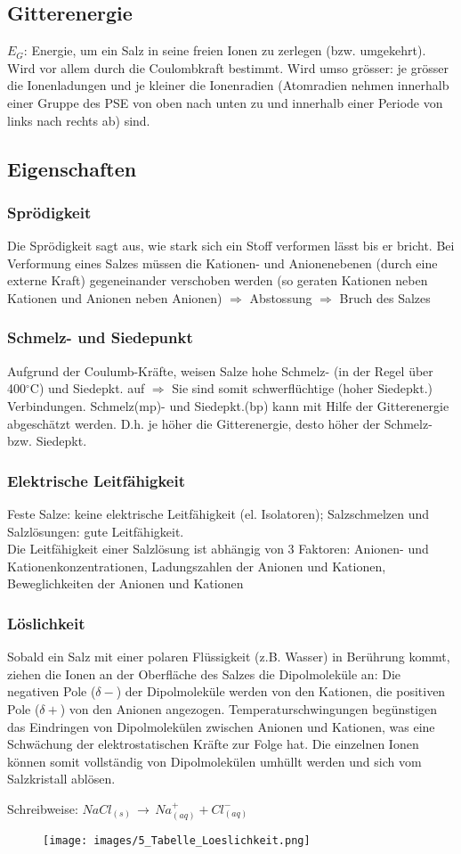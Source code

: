 \subsection{Gitterenergie}
$E_G$: Energie, um ein Salz in seine freien Ionen zu zerlegen (bzw. umgekehrt). Wird vor allem durch die Coulombkraft bestimmt. Wird umso grösser: je grösser die Ionenladungen und je kleiner die Ionenradien (Atomradien nehmen innerhalb einer Gruppe des PSE von oben nach unten zu und innerhalb einer Periode von links nach rechts ab) sind.

\subsection{Eigenschaften}
\subsubsection{Sprödigkeit}
Die Sprödigkeit sagt aus, wie stark sich ein Stoff verformen lässt bis er bricht. Bei Verformung eines Salzes müssen die Kationen- und Anionenebenen (durch eine externe Kraft) gegeneinander verschoben werden (so geraten Kationen neben Kationen und Anionen neben Anionen) $\Rightarrow$ Abstossung $\Rightarrow$ Bruch des Salzes

\subsubsection{Schmelz- und Siedepunkt}
Aufgrund der Coulumb-Kräfte, weisen Salze hohe Schmelz- (in der Regel über 400$^\circ$C) und Siedepkt. auf $\Rightarrow$ Sie sind somit schwerflüchtige (hoher Siedepkt.) Verbindungen. Schmelz(mp)- und Siedepkt.(bp) kann mit Hilfe der Gitterenergie abgeschätzt werden. D.h. je höher die Gitterenergie, desto höher der Schmelz- bzw. Siedepkt. 

\subsubsection{Elektrische Leitfähigkeit}
Feste Salze: keine elektrische Leitfähigkeit (el. Isolatoren); Salzschmelzen und Salzlösungen: gute Leitfähigkeit.\\
Die Leitfähigkeit einer Salzlösung ist abhängig von 3 Faktoren: Anionen- und Kationenkonzentrationen, Ladungszahlen der Anionen und Kationen, Beweglichkeiten der Anionen und Kationen

\subsubsection{Löslichkeit}
Sobald ein Salz mit einer polaren Flüssigkeit (z.B. Wasser) in Berührung kommt, ziehen die Ionen an der Oberfläche des Salzes die Dipolmoleküle an: Die negativen Pole ($\delta-$) der Dipolmoleküle werden von den Kationen, die positiven Pole ($\delta+$) von den Anionen angezogen. Temperaturschwingungen begünstigen das Eindringen von Dipolmolekülen zwischen Anionen und Kationen, was eine Schwächung der elektrostatischen Kräfte zur Folge hat. Die einzelnen Ionen können somit vollständig von Dipolmolekülen umhüllt werden und sich vom Salzkristall ablösen.

Schreibweise: $NaCl_{(s)} \, \rightarrow \, Na^+_{(aq)} + Cl^-_{(aq)}$ \\

\begin{figure}[htbp]
	\centering
	\texttt{[image: images/5\_Tabelle\_Loeslichkeit.png]}
\end{figure}